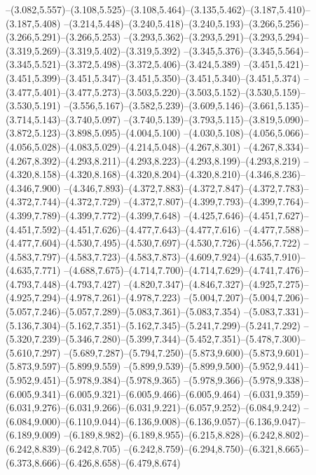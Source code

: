   --(3.082,5.557)--(3.108,5.525)--(3.108,5.464)--(3.135,5.462)--(3.187,5.410)--(3.187,5.408)%
  --(3.214,5.448)--(3.240,5.418)--(3.240,5.193)--(3.266,5.256)--(3.266,5.291)--(3.266,5.253)%
  --(3.293,5.362)--(3.293,5.291)--(3.293,5.294)--(3.319,5.269)--(3.319,5.402)--(3.319,5.392)%
  --(3.345,5.376)--(3.345,5.564)--(3.345,5.521)--(3.372,5.498)--(3.372,5.406)--(3.424,5.389)%
  --(3.451,5.421)--(3.451,5.399)--(3.451,5.347)--(3.451,5.350)--(3.451,5.340)--(3.451,5.374)%
  --(3.477,5.401)--(3.477,5.273)--(3.503,5.220)--(3.503,5.152)--(3.530,5.159)--(3.530,5.191)%
  --(3.556,5.167)--(3.582,5.239)--(3.609,5.146)--(3.661,5.135)--(3.714,5.143)--(3.740,5.097)%
  --(3.740,5.139)--(3.793,5.115)--(3.819,5.090)--(3.872,5.123)--(3.898,5.095)--(4.004,5.100)%
  --(4.030,5.108)--(4.056,5.066)--(4.056,5.028)--(4.083,5.029)--(4.214,5.048)--(4.267,8.301)%
  --(4.267,8.334)--(4.267,8.392)--(4.293,8.211)--(4.293,8.223)--(4.293,8.199)--(4.293,8.219)%
  --(4.320,8.158)--(4.320,8.168)--(4.320,8.204)--(4.320,8.210)--(4.346,8.236)--(4.346,7.900)%
  --(4.346,7.893)--(4.372,7.883)--(4.372,7.847)--(4.372,7.783)--(4.372,7.744)--(4.372,7.729)%
  --(4.372,7.807)--(4.399,7.793)--(4.399,7.764)--(4.399,7.789)--(4.399,7.772)--(4.399,7.648)%
  --(4.425,7.646)--(4.451,7.627)--(4.451,7.592)--(4.451,7.626)--(4.477,7.643)--(4.477,7.616)%
  --(4.477,7.588)--(4.477,7.604)--(4.530,7.495)--(4.530,7.697)--(4.530,7.726)--(4.556,7.722)%
  --(4.583,7.797)--(4.583,7.723)--(4.583,7.873)--(4.609,7.924)--(4.635,7.910)--(4.635,7.771)%
  --(4.688,7.675)--(4.714,7.700)--(4.714,7.629)--(4.741,7.476)--(4.793,7.448)--(4.793,7.427)%
  --(4.820,7.347)--(4.846,7.327)--(4.925,7.275)--(4.925,7.294)--(4.978,7.261)--(4.978,7.223)%
  --(5.004,7.207)--(5.004,7.206)--(5.057,7.246)--(5.057,7.289)--(5.083,7.361)--(5.083,7.354)%
  --(5.083,7.331)--(5.136,7.304)--(5.162,7.351)--(5.162,7.345)--(5.241,7.299)--(5.241,7.292)%
  --(5.320,7.239)--(5.346,7.280)--(5.399,7.344)--(5.452,7.351)--(5.478,7.300)--(5.610,7.297)%
  --(5.689,7.287)--(5.794,7.250)--(5.873,9.600)--(5.873,9.601)--(5.873,9.597)--(5.899,9.559)%
  --(5.899,9.539)--(5.899,9.500)--(5.952,9.441)--(5.952,9.451)--(5.978,9.384)--(5.978,9.365)%
  --(5.978,9.366)--(5.978,9.338)--(6.005,9.341)--(6.005,9.321)--(6.005,9.466)--(6.005,9.464)%
  --(6.031,9.359)--(6.031,9.276)--(6.031,9.266)--(6.031,9.221)--(6.057,9.252)--(6.084,9.242)%
  --(6.084,9.000)--(6.110,9.044)--(6.136,9.008)--(6.136,9.057)--(6.136,9.047)--(6.189,9.009)%
  --(6.189,8.982)--(6.189,8.955)--(6.215,8.828)--(6.242,8.802)--(6.242,8.839)--(6.242,8.705)%
  --(6.242,8.759)--(6.294,8.750)--(6.321,8.665)--(6.373,8.666)--(6.426,8.658)--(6.479,8.674)%
